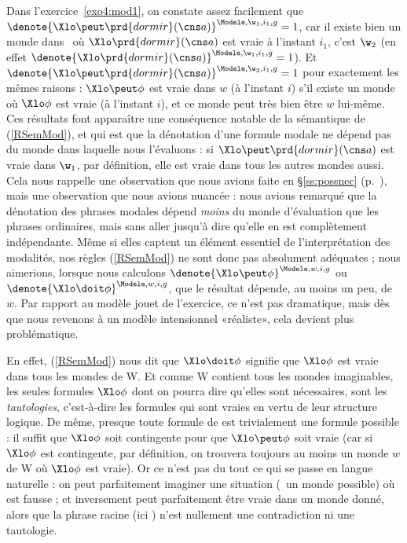 \medskip



\smallskip



\smallskip


Dans l'exercice~\ref{exo4:mod1}, on constate assez facilement que 
\(\denote{\Xlo\peut\prd{dormir}(\cns a)}^{\Modele,\w_1,i_1,g}=1\), 
car il existe bien un monde dans \Modele\ où $\Xlo\prd{dormir}(\cns a)$ est vraie à l'instant $i_1$, c'est $\w_2$ (en effet \(\denote{\Xlo\prd{dormir}(\cns a)}^{\Modele,\w_1,i_1,g}=1\)).
Et \(\denote{\Xlo\peut\prd{dormir}(\cns a)}^{\Modele,\w_2,i_1,g}=1\) pour exactement les mêmes raisons : $\Xlo\peut\phi$ est vraie dans $w$ (à l'instant $i$) s'il existe un monde où $\Xlo\phi$ est vraie (à l'instant $i$), et ce monde peut très bien être $w$ lui-même.  
Ces résultats font apparaître une conséquence notable de la sémantique de (\RSem\ref{RSemMod}), et qui est que la dénotation d'une formule modale ne dépend pas du monde dans laquelle nous l'évaluons : si \(\Xlo\peut\prd{dormir}(\cns a)\) est vraie dans $\w_1$, par définition, elle est vraie dans tous les autres mondes aussi.
Cela nous rappelle une observation que nous avions faite en \S\ref{ss:possnec} (p.~\pageref{ss:possnec-wdep}),
mais une observation que nous avions nuancée : nous avions remarqué que la dénotation des phrases modales dépend \emph{moins} du monde d'évaluation que les phrases ordinaires, mais sans aller jusqu'à dire qu'elle en est complètement indépendante. Même si elles captent un élément essentiel de l'interprétation des modalités, nos règles (\RSem\ref{RSemMod}) ne sont donc pas absolument adéquates ; nous aimerions, lorsque nous calculons \(\denote{\Xlo\peut\phi}^{\Modele,w,i,g}\) ou \(\denote{\Xlo\doit\phi}^{\Modele,w,i,g}\), que le résultat dépende, au moins un peu, de $w$.
Par rapport au modèle jouet de l'exercice, ce n'est pas dramatique, mais dès que nous revenons à un modèle intensionnel «réaliste», cela devient plus problématique.

En effet, (\RSem\ref{RSemMod}) nous dit que $\Xlo\doit\phi$ signifie que $\Xlo\phi$ est vraie dans tous les mondes de \Unv W. Et comme \Unv W contient tous les mondes imaginables, les seules formules $\Xlo\phi$ dont on pourra dire qu'elles sont nécessaires, sont les \emph{tautologies}, c'est-à-dire les formules qui sont vraies en vertu de leur structure logique.  De même, presque toute formule de {\LO} est trivialement une formule possible : il suffit que $\Xlo\phi$ soit contingente pour que $\Xlo\peut\phi$ soit vraie (car si $\Xlo\phi$ est contingente, par définition, on trouvera toujours au moins un monde $w$ de \Unv W où $\Xlo\phi$ est vraie). 
Or ce n'est
pas du tout ce qui se passe en langue naturelle : on peut parfaitement
imaginer une situation (\ie\ un monde possible) où \Next[a] est fausse ;
et inversement \Next[b] peut parfaitement être vraie dans un monde
donné, alors que la phrase racine (ici ) n'est nullement une contradiction ni une tautologie.


